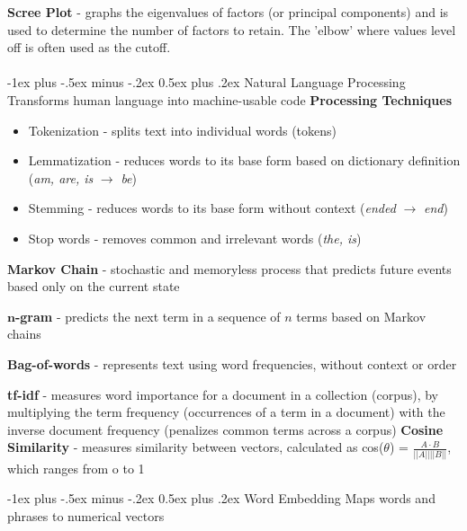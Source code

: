 \documentclass[10pt,landscape]{article}
\makeatletter
\renewcommand{\section}{\@startsection{section}{1}{0mm}%
                                {-1ex plus -.5ex minus -.2ex}%
                                {0.5ex plus .2ex}%
                                {\normalfont\large\bfseries}}
\renewcommand{\subsection}{\@startsection{subsection}{2}{0mm}%
                                {-1ex plus -.5ex minus -.2ex}%
                                {0.5ex plus .2ex}%
                                {\normalfont\normalsize\bfseries}}
\makeatother
\begin{document}
\begin{multicols}{3}
\smallskip
\textbf{Scree Plot} - graphs the eigenvalues of factors (or principal components) and is used to determine the number of factors to retain. The 'elbow' where values level off is often used as the cutoff.
\columnbreak
\\\textcolor{white}{.}\vspace{-5mm}\\ %
\section{Natural Language Processing}
Transforms human language into machine-usable code
\textbf{Processing Techniques}
\begin{itemize}[label={--},leftmargin=4mm]
\itemsep -.4mm
\item Tokenization - splits text into individual words (tokens)
\item Lemmatization - reduces words to its base form based on dictionary definition (\emph{am, are, is} $\to$ \emph{be})
\item Stemming - reduces words to its base form without context (\emph{ended} $\to$ \emph{end})
\item Stop words - removes common and irrelevant words (\emph{the, is})
\end{itemize}

\textbf{Markov Chain} - stochastic and memoryless process that predicts future events based only on the current state

$\boldsymbol{n}$\textbf{-gram} - predicts the next term in a sequence of $n$ terms based on Markov chains

\textbf{Bag-of-words} - represents text using word frequencies, without context or order

\textbf{tf-idf} - measures word importance for a document in a collection (corpus), by multiplying the term frequency (occurrences of a term in a document) with the inverse document frequency (penalizes common terms across a corpus)
\textbf{Cosine Similarity} - measures similarity between vectors, calculated as cos($\theta$) =
$\frac{A\cdot B}{||A||||B||} $, which ranges from o to 1

\subsection{Word Embedding}
Maps words and phrases to numerical vectors


\end{multicols}
\end{document}
